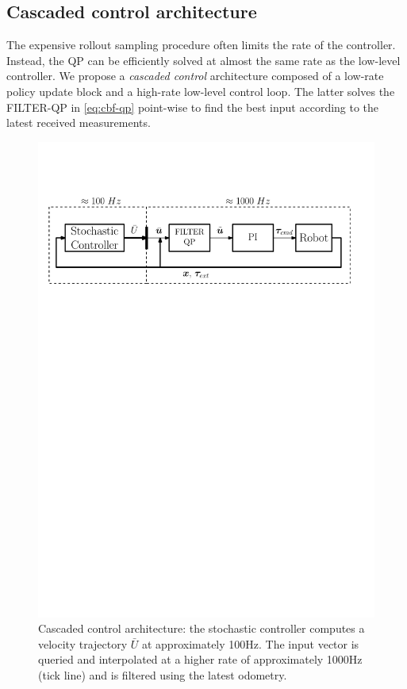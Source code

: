 \subsection{Cascaded control architecture}
The expensive rollout sampling procedure often limits the rate of the controller. Instead, the QP can be efficiently solved at almost the same rate as the low-level controller. We propose a \emph{cascaded control} architecture composed of a low-rate policy update block and a high-rate low-level control loop. The latter solves the FILTER-QP in \eqn \eqref{eq:cbf-qp} point-wise to find the best input according to the latest received measurements. 
\begin{figure}[t!]
\centering
\hspace*{-0.7cm}
\includegraphics[width=1.1\columnwidth]{figures/schemes/high_level_architecture.pdf}
\caption{Cascaded control architecture: the stochastic controller computes a velocity trajectory $\bar{U}$ at approximately 100Hz. The input vector is queried and interpolated at a higher rate of approximately 1000Hz (tick line) and is filtered using the latest odometry.} \label{fig:cascaded_architecture}
\end{figure}

